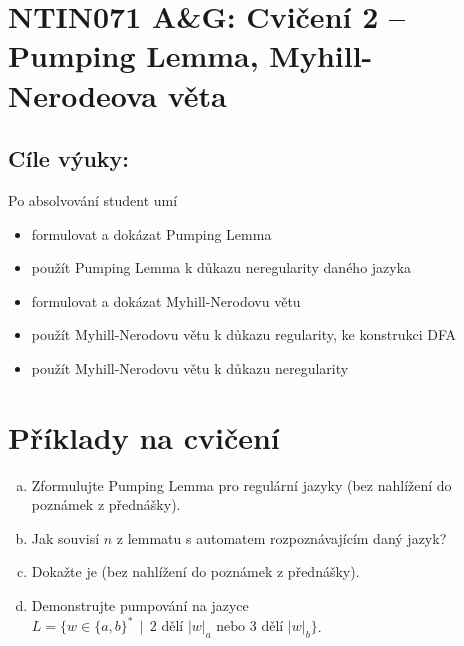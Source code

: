 \documentclass[a4paper,12pt]{amsart}
\begin{document}
\thispagestyle{empty}

\section*{NTIN071 A\&G: Cvičení 2 -- Pumping Lemma, Myhill-Nerodeova věta}

\subsection*{Cíle výuky:} Po absolvování student umí

\begin{itemize}\setlength{\itemsep}{0pt}
    \item formulovat a dokázat Pumping Lemma
    \item použít Pumping Lemma k důkazu neregularity daného jazyka
    \item formulovat a dokázat Myhill-Nerodovu větu
    \item použít Myhill-Nerodovu větu k důkazu regularity, ke konstrukci DFA
    \item použít Myhill-Nerodovu větu k důkazu neregularity
\end{itemize}


\section*{Příklady na cvičení}


\medskip\begin{problem}

    \begin{enumerate}[(a)]\setlength\itemsep{6pt}
        \item Zformulujte Pumping Lemma pro regulární jazyky (bez nahlížení do poznámek z přednášky).
        \item Jak souvisí $n$ z lemmatu s automatem rozpoznávajícím daný jazyk?
        \item Dokažte je (bez nahlížení do poznámek z přednášky).
        \item Demonstrujte pumpování na jazyce $L=\{w\in\{a,b\}^* \,\mid\,\text{2 dělí $|w|_a$ nebo 3 dělí $|w|_b$}\}$.
    \end{enumerate}

\end{problem}
\end{document}
